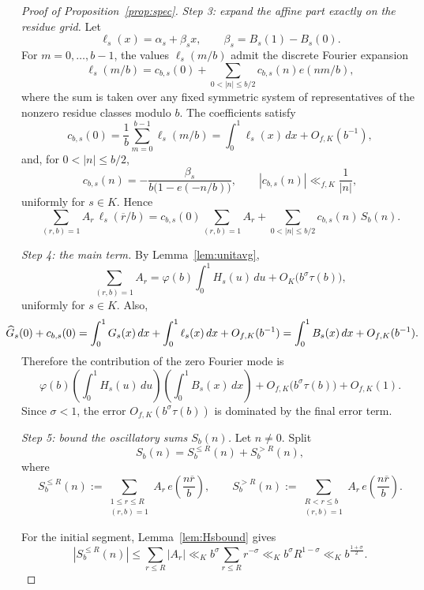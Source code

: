 \documentclass[a4paper,american,11pt]{amsart}
\theoremstyle{plain}
\theoremstyle{definition}
\begin{document}
\begin{proof}[Proof of Proposition~\ref{prop:spec}]
\emph{Step 3: expand the affine part exactly on the residue grid.}
Let
\[
\ell_s(x)=\alpha_s+\beta_s x,
\qquad
\beta_s=B_s(1)-B_s(0).
\]
For \(m=0,\dots,b-1\), the values \(\ell_s(m/b)\) admit the discrete Fourier expansion
\[
\ell_s(m/b)=c_{b,s}(0)+\sum_{0<|n|\le b/2} c_{b,s}(n)e(nm/b),
\]
where the sum is taken over any fixed symmetric system of representatives of the nonzero residue classes modulo \(b\). The coefficients satisfy
\[
c_{b,s}(0)
=
\frac1b\sum_{m=0}^{b-1}\ell_s(m/b)
=
\int_0^1 \ell_s(x)\,dx+O_{f,K}(b^{-1}),
\]
and, for \(0<|n|\le b/2\),
\[
c_{b,s}(n)
=
-\frac{\beta_s}{b\bigl(1-e(-n/b)\bigr)},
\qquad
|c_{b,s}(n)|\ll_{f,K}\frac1{|n|},
\]
uniformly for \(s\in K\). Hence
\[
\sum_{(r,b)=1} A_r\,\ell_s(\overline r/b)
=
c_{b,s}(0)\sum_{(r,b)=1}A_r
+
\sum_{0<|n|\le b/2} c_{b,s}(n)\,S_b(n).
\]

\emph{Step 4: the main term.}
By Lemma~\ref{lem:unitavg},
\[
\sum_{(r,b)=1}A_r
=
\varphi(b)\int_0^1 H_s(u)\,du
+
O_K\bigl(b^\sigma\tau(b)\bigr),
\]
uniformly for \(s\in K\). Also,
\[\mkern-26mu
\widehat G_s(0)+c_{b,s}(0)
=
\int_0^1 G_s(x)\,dx+\int_0^1 \ell_s(x)\,dx+O_{f,K}(b^{-1})
=
\int_0^1 B_s(x)\,dx+O_{f,K}(b^{-1}).
\]
Therefore the contribution of the zero Fourier mode is
\[
\varphi(b)\left(\int_0^1 H_s(u)\,du\right)\left(\int_0^1 B_s(x)\,dx\right)
+
O_{f,K}\bigl(b^\sigma\tau(b)\bigr)
+
O_{f,K}(1).
\]
Since \(\sigma<1\), the error \(O_{f,K}(b^\sigma\tau(b))\) is dominated by the final error term.

\emph{Step 5: bound the oscillatory sums \(S_b(n)\).}
Let \(n\neq0\). Split
\[
S_b(n)=S_b^{\le R}(n)+S_b^{>R}(n),
\]
where
\[
S_b^{\le R}(n):=\sum_{\substack{1\le r\le R\\(r,b)=1}}A_r\,e\!\left(\frac{n\overline r}{b}\right),
\qquad
S_b^{>R}(n):=\sum_{\substack{R<r\le b\\(r,b)=1}}A_r\,e\!\left(\frac{n\overline r}{b}\right).
\]

For the initial segment, Lemma~\ref{lem:Hsbound} gives
\[
|S_b^{\le R}(n)|
\le \sum_{r\le R}|A_r|
\ll_K b^\sigma\sum_{r\le R}r^{-\sigma}
\ll_K b^\sigma R^{1-\sigma}
\ll_K b^{\frac{1+\sigma}{2}}.
\]


\end{proof}
\end{document}
